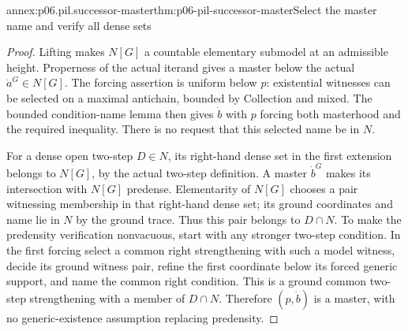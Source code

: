 \begin{annexitem}{annex:p06.pil.successor-master}{thm:p06-pil-successor-master}{Select the master name and verify all dense sets}
\begin{proof}
Lifting makes \(N[G]\) a countable elementary submodel at an admissible
height. Properness of the actual iterand gives a master below the
actual \(\dot a^G\in N[G]\). The forcing assertion is uniform below
\(p\): existential witnesses can be selected on a maximal antichain,
bounded by Collection and mixed. The bounded condition-name lemma
then gives \(\dot b\) with \(p\) forcing both masterhood and the
required inequality. There is no request that this selected name be in \(N\).

For a dense open two-step \(D\in N\), its right-hand dense set in
the first extension belongs to \(N[G]\), by the actual two-step
definition. A master \(\dot b^G\) makes its intersection with
\(N[G]\) predense. Elementarity of \(N[G]\) chooses a pair witnessing
membership in that right-hand dense set; its ground coordinates and
name lie in \(N\) by the ground trace. Thus this pair belongs to
\(D\cap N\). To make the predensity verification nonvacuous, start
with any stronger two-step condition. In the first forcing select a
common right strengthening with such a model witness, decide its
ground witness pair, refine the first coordinate below its forced
generic support, and name the common right condition. This is a ground
common two-step strengthening with a member of \(D\cap N\).
Therefore \((p,\dot b)\) is a master, with no generic-existence
assumption replacing predensity.
\end{proof}
\end{annexitem}

